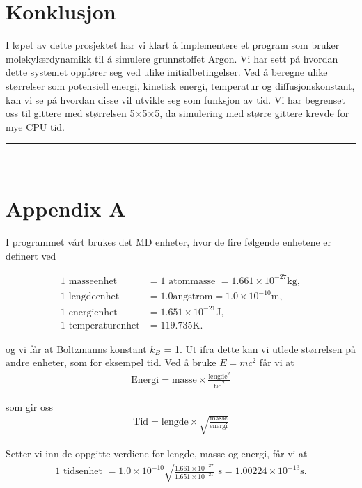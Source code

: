 \documentclass[paper=a4, fontsize=11pt]{scrartcl} %
\numberwithin{equation}{section} %
\numberwithin{figure}{section} %
\numberwithin{table}{section} %
\newcommand{\horrule}[1]{\rule{\linewidth}{#1}} %
\begin{document}
\section{Konklusjon}
I løpet av dette prosjektet har vi klart å implementere et program som bruker molekylærdynamikk til å simulere grunnstoffet Argon. Vi har sett på hvordan dette systemet oppfører seg ved ulike initialbetingelser. Ved å beregne ulike størrelser som potensiell energi, kinetisk energi, temperatur og diffusjonskonstant, kan vi se på hvordan disse vil utvikle seg som funksjon av tid. Vi har begrenset oss til gittere med størrelsen 5$\times$5$\times$5, da simulering med større gittere krevde for mye CPU tid.


\horrule{2pt} \\[0.5cm] %

\section{Appendix A}
I programmet vårt brukes det MD enheter, hvor de fire følgende enhetene er definert ved

\begin{align}
	\text{1 masseenhet } &= 1 \text{ atommasse } = 1.661\times 10^{-27}\mathrm{kg},\\
	\text{1 lengdeenhet } &= 1.0 \mathrm{angstrom} = 1.0\times 10^{-10}\mathrm{m},\\
	\text{1 energienhet } &= 1.651\times 10^{-21}\mathrm{J},\\
	\text{1 temperaturenhet} &= 119.735\mathrm{K}.
\end{align}

og vi får at Boltzmanns konstant $k_B$ = 1. Ut ifra dette kan vi utlede størrelsen på andre enheter, som for eksempel tid. Ved å bruke $E = mc^2$ får vi at
\begin{align}
\text{Energi} = \text{masse} \times \frac{\text{lengde}^2}{\text{tid}^2}
\end{align}

som gir oss 
\begin{align}
\text{Tid} = \text{lengde} \times \sqrt{\frac{\text{masse}}{\text{energi}}}
\end{align}

Setter vi inn de oppgitte verdiene for lengde, masse og energi, får vi at
\begin{align}
\text{1 tidsenhet } = 1.0 \times 10^{-10}\sqrt{\frac{1.661\times 10^{-27}}{1.651\times 10^{-21}}} \text{ s} = 1.00224\times 10^{-13}\mathrm{s}.
\end{align}
\end{document}
